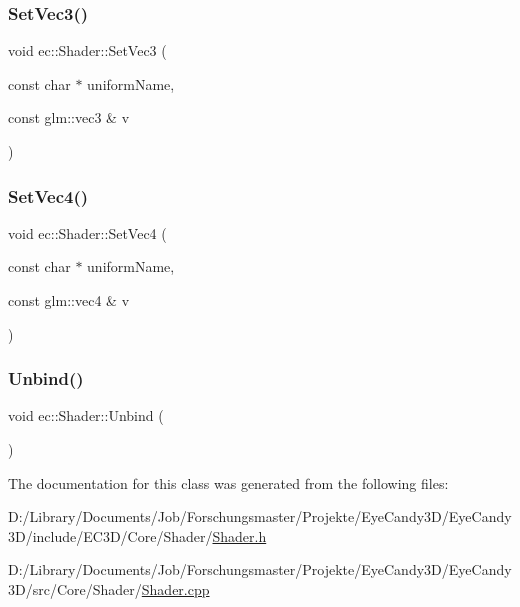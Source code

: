 \mbox{\label{classec_1_1_shader_a10bd92bfcbfe0d65af1fa7fa85f1c14f}} 
\subsubsection{\texorpdfstring{Set\+Vec3()}{SetVec3()}}
{\footnotesize\ttfamily void ec\+::\+Shader\+::\+Set\+Vec3 (\begin{DoxyParamCaption}\item[{const char $\ast$}]{uniform\+Name,  }\item[{const glm\+::vec3 \&}]{v }\end{DoxyParamCaption})}

\mbox{\label{classec_1_1_shader_a7ef02fde1aeef8a2e67e03fe33cce220}} 
\subsubsection{\texorpdfstring{Set\+Vec4()}{SetVec4()}}
{\footnotesize\ttfamily void ec\+::\+Shader\+::\+Set\+Vec4 (\begin{DoxyParamCaption}\item[{const char $\ast$}]{uniform\+Name,  }\item[{const glm\+::vec4 \&}]{v }\end{DoxyParamCaption})}

\mbox{\label{classec_1_1_shader_afec339096238f064093aa52f94c0259e}} 
\subsubsection{\texorpdfstring{Unbind()}{Unbind()}}
{\footnotesize\ttfamily void ec\+::\+Shader\+::\+Unbind (\begin{DoxyParamCaption}{ }\end{DoxyParamCaption})}



The documentation for this class was generated from the following files\+:\begin{DoxyCompactItemize}
\item 
D\+:/\+Library/\+Documents/\+Job/\+Forschungsmaster/\+Projekte/\+Eye\+Candy3\+D/\+Eye\+Candy3\+D/include/\+E\+C3\+D/\+Core/\+Shader/\mbox{\hyperlink{_shader_8h}{Shader.\+h}}\item 
D\+:/\+Library/\+Documents/\+Job/\+Forschungsmaster/\+Projekte/\+Eye\+Candy3\+D/\+Eye\+Candy3\+D/src/\+Core/\+Shader/\mbox{\hyperlink{_shader_8cpp}{Shader.\+cpp}}\end{DoxyCompactItemize}
